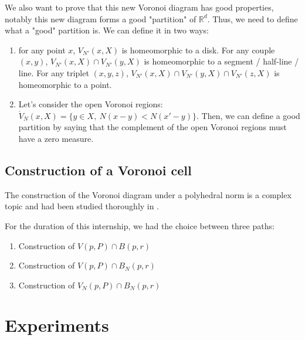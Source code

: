 We also want to prove that this new Voronoi diagram has good properties, notably
this new diagram forms a good "partition" of $ \mathbb{R}^d $. Thus, we need to
define what a "good" partition is.
We can define it in two ways:
\begin{enumerate}
    \item for any point $ x $, $ V_{N'}(x, X) $ is homeomorphic to a disk. For
        any couple $ (x, y) $, $ V_{N'}(x, X) \cap V_{N'}(y, X) $ is
        homeomorphic to a segment / half-line / line. For any triplet $ (x, y,
        z) $, $ V_{N'}(x, X) \cap V_{N'}(y, X) \cap V_{N'}(z, X) $ is
        homeomorphic to a point.
    \item Let's consider the open Voronoi regions: $ \ocirc{V}_N(x, X) = \{ y
        \in X,~ N(x - y) < N(x' - y)\} $. Then, we can define a good partition
        by saying that the complement of the open Voronoi regions must have a
        zero measure.
\end{enumerate}

\subsection{Construction of a Voronoi cell}

The construction of the Voronoi diagram under a polyhedral norm is a complex
topic and had been studied thoroughly in \cite{ma2000bisectors}.

For the duration of this internship, we had the choice between three paths:
\begin{enumerate}
    \item Construction of $ V(p, P) \cap B(p, r) $
    \item Construction of $ V(p, P) \cap B_N(p, r) $
    \item Construction of $ V_N(p, P) \cap B_N(p, r) $
\end{enumerate}

\section{Experiments}



